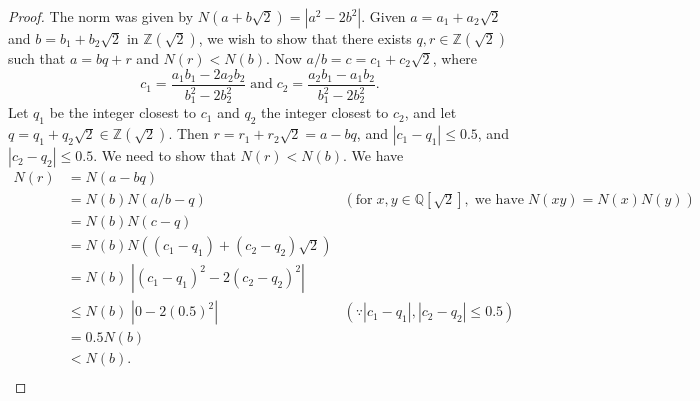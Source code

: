 \documentclass{article}
\begin{document}
  \begin{proof}
    The norm was given by $N(a+b\sqrt{2})=|a^2-2b^2|$. Given
    $a=a_1+a_2\sqrt{2}$ and $b=b_1+b_2\sqrt{2}$ in $\mathbb{Z}(\sqrt{2})$,
    we wish to show that there exists $q,r\in\mathbb{Z}(\sqrt{2})$ such
    that $a=bq+r$ and $N(r)<N(b)$. Now $a/b=c=c_1+c_2\sqrt{2}$, where
    \[c_1=\frac{a_1b_1-2a_2b_2}{b_1^2-2b_2^2}\; \text{and}\;
    c_2=\frac{a_2b_1-a_1b_2}{b_1^2-2b_2^2}.\] Let $q_1$ be the integer
    closest to $c_1$ and $q_2$ the integer closest to $c_2$, and let
    $q=q_1+q_2\sqrt{2}\in\mathbb{Z}(\sqrt{2})$. Then
    $r=r_1+r_2\sqrt{2}=a-bq$, and $|c_1-q_1|\leq0.5$, and
    $|c_2-q_2|\leq0.5$. We need to show that $N(r)<N(b)$. We have
    \begin{align*}
      N(r) &= N(a-bq) \\
        &=N(b)N(a/b-q) &(\text{for}\; x,y\in\mathbb{Q}[\sqrt{2}],\;
          \text{we have}\; N(xy)=N(x)N(y)) \\
        &=N(b)N(c-q) \\
        &=N(b)N\left((c_1-q_1)+(c_2-q_2)\sqrt{2}\right) \\
        &=N(b)\; \left|(c_1-q_1)^2-2(c_2-q_2)^2\right| \\
        &\leq N(b)\; \left|0-2(0.5)^2\right| &(\because
          |c_1-q_1|,|c_2-q_2|\leq0.5) \\
        &=0.5N(b) \\
        &<N(b). \\
    \end{align*}
  \end{proof}
\end{document}
